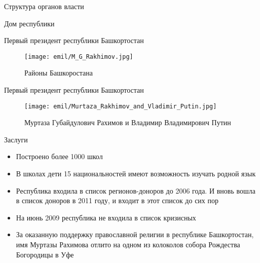 \begin{frame}{Структура органов власти}

    
\end{frame}

\begin{frame}{Дом республики}

    
\end{frame}

\begin{frame}{Первый президент республики Башкортостан}

\begin{figure}[h!]
	\begin{center}
		{\texttt{[image: emil/M\_G\_Rakhimov.jpg]}}
		\caption{Районы Башкоростана}
	\end{center}
\end{figure}

\end{frame}


\begin{frame}{Первый президент республики Башкортостан}

\begin{figure}[h!]
	\begin{center}
		{\texttt{[image: emil/Murtaza\_Rakhimov\_and\_Vladimir\_Putin.jpg]}}
		\caption{Муртаза Губайдулович Рахимов и Владимир Владимирович Путин}
	\end{center}
\end{figure}

\end{frame}

\begin{frame}{Заслуги}

\begin{itemize}
	\item Построено более 1000 школ
	\item В школах дети 15 национальностей имеют возможность изучать родной язык
	\item Республика входила в список регионов-доноров до 2006 года. И вновь вошла в список доноров в 2011 году, и входит в этот список до сих пор
	\item На июнь 2009 республика не входила в список кризисных
	\item За оказанную поддержку православной религии в республике Башкортостан, имя Муртазы Рахимова отлито на одном из колоколов собора Рождества Богородицы в Уфе
\end{itemize}

\end{frame}


